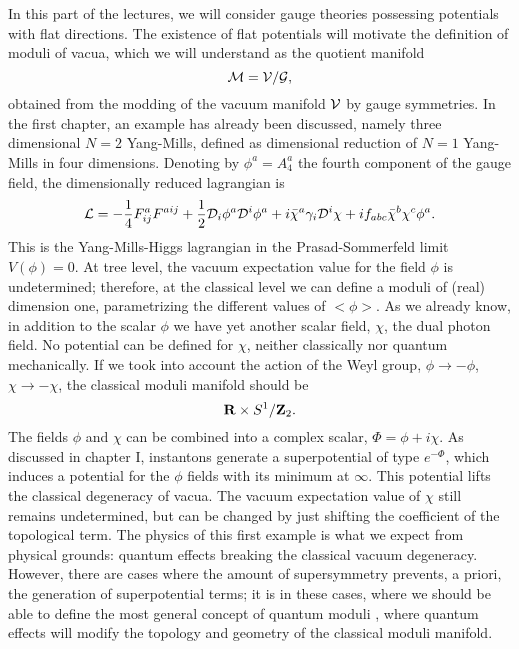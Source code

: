 In this part of the lectures, we will consider gauge theories
possessing potentials with flat directions. The existence of flat
potentials will motivate the definition of moduli of vacua, which
we will understand as the quotient manifold
\begin{equation}
{\cal M} = {\cal V}/{\cal G},
\label{eq:II1}
\end{equation}
obtained from the modding of the vacuum manifold ${\cal V}$ by
gauge symmetries. In the first chapter, an example has already
been discussed, namely three dimensional $N\!=\!2$ Yang-Mills,
defined as dimensional reduction of $N\!=\!1$ Yang-Mills in four
dimensions. Denoting by $\phi^{a}=A_4^{a}$ the fourth component of
the gauge field, the dimensionally reduced lagrangian is 
\begin{equation}
{\cal L} = - \frac {1}{4} F_{ij}^{a} F^{aij} + \frac {1}{2} {\cal
D}_i \phi^{a} {\cal D}^{i} \phi^{a} + i \bar{\chi}^{a} \gamma_i
{\cal D}^{i} \chi + i f_{abc} \bar{\chi}^{b} \chi^{c} \phi^{a}.
\label{eq:II2}
\end{equation}
This is the Yang-Mills-Higgs lagrangian in the Prasad-Sommerfeld
limit $V(\phi)=0$. At tree level, the vacuum expectation value
for the field $\phi$ is undetermined; therefore, at the classical
level we can define a moduli of (real) dimension one, 
parametrizing the different values of $<\phi>$. As we already
know, in addition to the scalar $\phi$ we have yet another scalar
field, $\chi$, the dual photon field. No potential can be defined
for $\chi$, neither classically nor quantum mechanically. If we
took into account the action of the Weyl group, $\phi \rightarrow
- \phi$, $\chi \rightarrow - \chi$, the classical moduli manifold
should be
\begin{equation}
{\bf R} \times S^{1} / {\bf Z}_2.
\label{eq:II3}
\end{equation}
The fields $\phi$ and $\chi$ can be combined into a complex
scalar, $\Phi = \phi + i \chi$. As discussed in chapter I,
instantons generate a superpotential of type $e^{-\Phi}$, which
induces a potential for the $\phi$ fields with its minimum at
$\infty$. This potential lifts the classical degeneracy of vacua.
The vacuum expectation value of $\chi$ still remains
undetermined, but can be changed by just shifting the coefficient
of the topological term. The physics of this first example is
what we expect from physical grounds: quantum effects breaking
the classical vacuum degeneracy. However, there are cases where
the amount of supersymmetry prevents, a priori, the generation of
superpotential terms; it is in these cases, where we should be able
to define the most general concept of quantum moduli \cite{SW,SW2}, where
quantum effects will modify the topology and geometry of the
classical moduli manifold.


